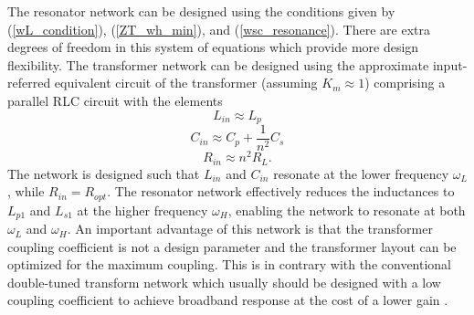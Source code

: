 \documentclass{IEEEtran}
\begin{document}
The resonator network can be designed using the conditions given by (\ref{wL_condition}), (\ref{ZT_wh_min}), and (\ref{wsc_resonance}). There are extra degrees of freedom in this system of equations which provide more design flexibility. The transformer network can be designed using the approximate input-referred equivalent circuit of the transformer (assuming $K_m \approx 1$) comprising a parallel RLC circuit with the elements
\begin{equation}
    \label{Lin}
    L_{in} \approx L_p 
\end{equation}
\begin{equation}
    \label{Cin}
    C_{in} \approx C_p + \frac{1}{n^2}C_s
\end{equation}
\begin{equation}
    \label{Rin}
    R_{in} \approx n^2 R_L.
\end{equation}
The network is designed such that $ L_{in}$ and $C_{in}$ resonate at the lower frequency $\omega_L$, while $R_{in}=R_{opt}$. The resonator network effectively reduces the inductances to $L_{p1}$ and $L_{s1}$ at the higher frequency $\omega_H$, enabling the network to resonate at both $\omega_L$ and $\omega_H$. An important advantage of this network is that the transformer coupling coefficient is not a design parameter and the transformer layout can be optimized for the maximum coupling. This is in contrary with the conventional double-tuned transform network which usually should be designed with a low coupling coefficient to achieve broadband response at the cost of a lower gain \cite{vigilante-jssc2018, mazzanti2018second, bevilacqua2020doubly}.




\end{document}
